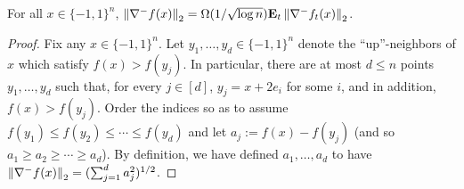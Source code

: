 \begin{lemma}
	For all $x\in \{-1,1\}^n$, $\left\lVert \nabla^- f(x) \right\rVert_2 = \Omega(1/\sqrt{\log n}) \hbox{\bf E}_t \left\lVert \nabla^- f_t(x) \right\rVert_2 $.	
\end{lemma}
\begin{proof}
Fix any $x \in \{-1,1\}^n$. Let $y_1, \ldots, y_d \in \{-1,1\}^n$ denote the ``up''-neighbors of $x$ which satisfy $f(x) > f(y_j)$. In particular, there are at most $d \leq n$ points $y_1 ,\dots, y_d$ such that, for every $j \in [d]$, $y_j = x + 2e_i$ for some $i$, and in addition, $f(x) > f(y_j)$.
Order the indices so as to assume $f(y_1) \leq f(y_2) \leq \cdots \leq f(y_d)$ and let $a_j := f(x) - f(y_j)$ (and so $a_1 \geq a_2 \geq \cdots \geq a_d$). By definition, we have defined $a_1,\dots, a_d$ to have $\left\lVert \nabla^- f(x) \right\rVert_2 = (\sum_{j=1}^d a^2_j)^{1/2}$.


\end{proof}
